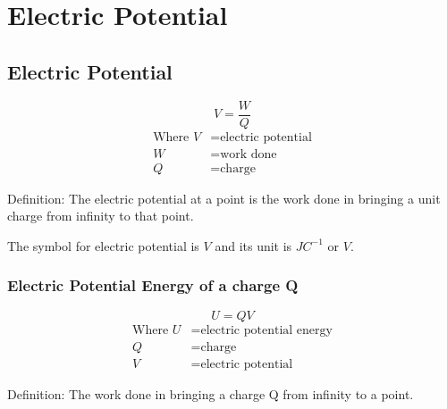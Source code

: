\documentclass[../../../main.tex]{subfiles}
\begin{document}
\pagebreak

\section{Electric Potential}

\subsection{Electric Potential}

\begin{equation}
    V=\frac{W}{Q}
\end{equation}
\begin{align*}
    \text{Where } V & = \text{electric potential} \\
    W               & = \text{work done}          \\
    Q               & = \text{charge}
\end{align*}

\begin{mdframed}
    Definition: The electric potential at a point is the work done in bringing a unit charge from infinity to that point.
\end{mdframed}

The symbol for electric potential is \(V\) and its unit is \(JC^{-1}\) or \(V\).

\bigskip


\subsubsection{Electric Potential Energy of a charge Q}

\begin{equation}
    U=QV
\end{equation}
\begin{align*}
    \text{Where } U & = \text{electric potential energy} \\
    Q               & = \text{charge}                    \\
    V               & = \text{electric potential}
\end{align*}

\begin{mdframed}
    Definition: The work done in bringing a charge Q from infinity to a point.
\end{mdframed}
\end{document}
